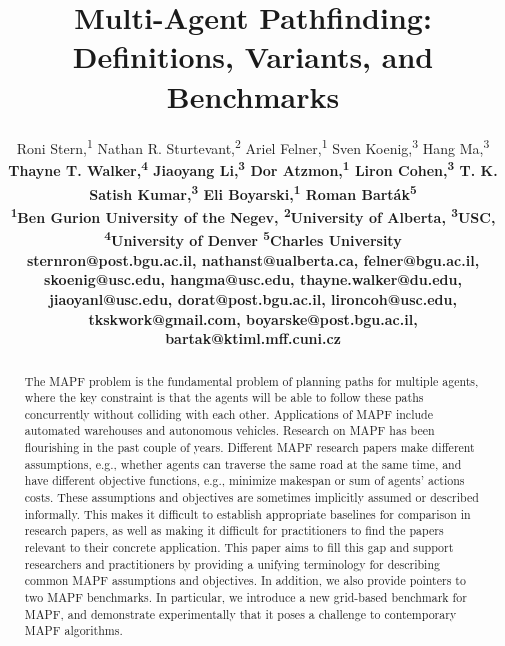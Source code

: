 \documentclass[letterpaper]{article} %
\title{Multi-Agent Pathfinding: Definitions, Variants, and Benchmarks}
\author{
Roni Stern,\textsuperscript{\rm 1}
Nathan R. Sturtevant,\textsuperscript{\rm 2}
Ariel Felner,\textsuperscript{\rm 1}
Sven Koenig,\textsuperscript{\rm 3}
Hang Ma,\textsuperscript{\rm 3}\\
\bf \Large Thayne T. Walker,\textsuperscript{\rm 4}
Jiaoyang Li,\textsuperscript{\rm 3}
Dor Atzmon,\textsuperscript{\rm 1}
Liron Cohen,\textsuperscript{\rm 3}
T. K. Satish Kumar,\textsuperscript{\rm 3}
Eli Boyarski,\textsuperscript{\rm 1}
Roman Bart\'{a}k\textsuperscript{\rm 5} \\
\textsuperscript{\rm 1}Ben Gurion University of the Negev,
\textsuperscript{\rm 2}University of Alberta,
\textsuperscript{\rm 3}USC,
\textsuperscript{\rm 4}University of Denver
\textsuperscript{\rm 5}Charles University\\
sternron@post.bgu.ac.il,
nathanst@ualberta.ca,
felner@bgu.ac.il,
skoenig@usc.edu,
hangma@usc.edu,
thayne.walker@du.edu,\\
jiaoyanl@usc.edu,
dorat@post.bgu.ac.il,
lironcoh@usc.edu,
tkskwork@gmail.com,
boyarske@post.bgu.ac.il,
bartak@ktiml.mff.cuni.cz
}
\newcommand{\mapf}{\ac{MAPF}\xspace}
\begin{document}
\maketitle
\begin{abstract}	The \mapf problem is the fundamental problem of planning paths for multiple agents, where the key constraint is that the agents will be able to follow these paths concurrently without colliding with each other. Applications of \mapf include automated warehouses and autonomous vehicles. Research on \mapf has been flourishing in the past couple of years.
	Different \mapf research papers make different assumptions, e.g., whether agents can traverse the same road at the same time, and have different objective functions, e.g., minimize makespan or sum of agents' actions costs.
	These assumptions and objectives are sometimes implicitly assumed or described informally. This makes it difficult to establish appropriate baselines for comparison in research papers, as well as making it difficult for practitioners to find the papers relevant to their concrete application.
	This paper aims to fill this gap and support researchers and practitioners by providing a unifying terminology for describing common \mapf assumptions and objectives. In addition, we also provide pointers to two \mapf benchmarks. In particular, we introduce a new grid-based benchmark for \mapf, and demonstrate experimentally that it poses a challenge to contemporary \mapf algorithms.
\end{abstract}
\end{document}
